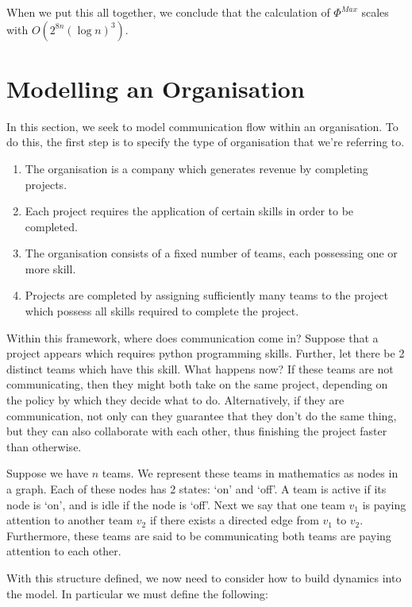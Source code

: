 When we put this all together, we conclude that the calculation of $\Phi^{Max}$ scales with $O( 2^{8n}(\log n)^3)$.


\section{Modelling an Organisation}

In this section, we seek to model communication flow within an organisation. To do this, the first step is to specify the type of organisation that we're referring to. 

\begin{enumerate}
	\item The organisation is a company which generates revenue by completing projects.
	
	\item Each project requires the application of certain skills in order to be completed.
	
	\item The organisation consists of a fixed number of teams, each possessing one or more skill.
	
	\item Projects are completed by assigning sufficiently many teams to the project which possess all skills required to complete the project.
\end{enumerate} 

Within this framework, where does communication come in? Suppose that a project appears which requires python programming skills. Further, let there be 2 distinct teams which have this skill. What happens now? If these teams are not communicating, then they might both take on the same project, depending on the policy by which they decide what to do. Alternatively, if they are communication, not only can they guarantee that they don't do the same thing, but they can also collaborate with each other, thus finishing the project faster than otherwise.

Suppose we have $n$ teams. We represent these teams in mathematics as nodes in a graph. Each of these nodes has 2 states: `on' and `off'. A team is active if its node is `on', and is idle if the node is `off'. Next we say that one team $v_1$ is paying attention to another team $v_2$ if there exists a directed edge from $v_1$ to $v_2$. Furthermore, these teams are said to be communicating both teams are paying attention to each other.

With this structure defined, we now need to consider how to build dynamics into the model. In particular we must define the following:

